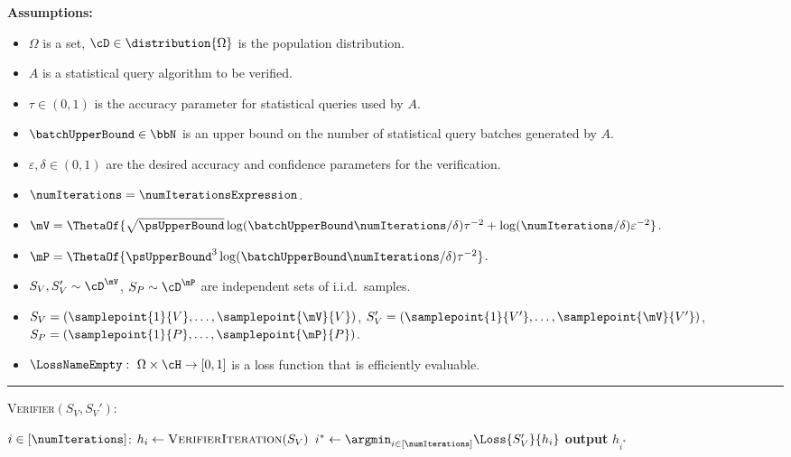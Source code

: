 \documentclass{toc}
\begin{document}
\begin{protocol}[H]
	\begin{ShadedAlgorithmBox}
		{\bfseries Assumptions:} 
		\begin{itemize}
			\item{
				$\Omega$ is a set, $\cD \in \distribution{\Omega}$ is the population distribution.
			}
			\item{
				$A$ is a statistical query algorithm to be verified.
			}
			\item{
				$\tau \in (0,1)$ is the accuracy parameter for statistical queries used by $A$.
			}
			\item{
				$\batchUpperBound \in \bbN$ is an upper bound on the number of statistical query batches generated by $A$.
			}
			\item{
				$\varepsilon,\delta \in (0,1)$ are the desired accuracy and confidence parameters for the verification.
			}
			\item{
				$\numIterations = \numIterationsExpression$.
			}
			\item{
				$\mV = \ThetaOf{\sqrt{\psUpperBound}\log(\batchUpperBound \numIterations/\delta)\tau^{-2} + \log(\numIterations/\delta)\varepsilon^{-2}}$.
			}
			\item{
				$\mP = \ThetaOf{\psUpperBound^3\log(\batchUpperBound \numIterations/\delta)\tau^{-2}}$.
			}
			\item{
				$S_{V},S_{V}' \sim \cD^{\mV}$, $S_P \sim \cD^{\mP}$ are independent sets of i.i.d.\ samples.
			}
			\item{
				$S_{V} = (\samplepoint{1}{V},\dots,\samplepoint{\mV}{V})$, $S_{V}' = (\samplepoint{1}{V'},\dots,\samplepoint{\mV}{V'})$, $S_P = (\samplepoint{1}{P},\dots,\samplepoint{\mP}{P})$.
			}
			\item{
				$\LossNameEmpty: ~ \Omega \times \cH \rightarrow [0,1]$ is a loss function that is efficiently evaluable.
			}
		\end{itemize}
		
		\noindent\rule{\textwidth}{0.5pt}
		
		\vspace*{0.5em}
		
		\textsc{Verifier}$(S_V, S_V')$:
		\begin{algorithmic}
			\For $i \in [\numIterations]$: 
			\State $h_i \gets \textsc{VerifierIteration}(S_V)$
			\EndFor
			\State $i^* \gets \argmin_{i \in [\numIterations]} \Loss{S_V'}{h_i}$
			\State \textbf{output} $h_{i^*}$
		\end{algorithmic}
		

\end{ShadedAlgorithmBox}
\end{protocol}
\end{document}
